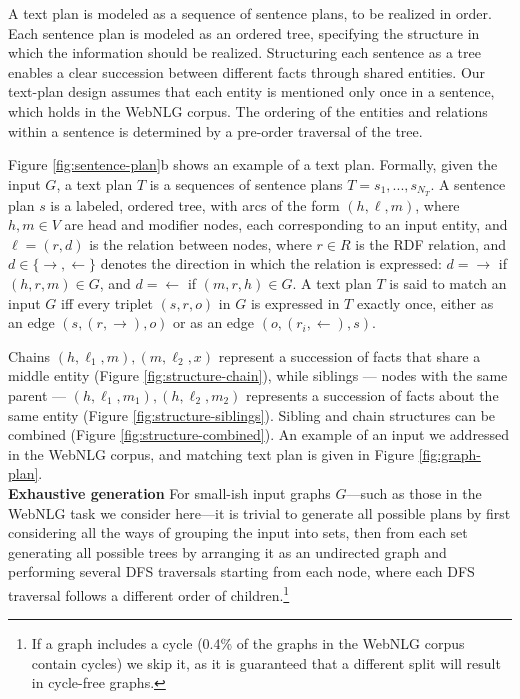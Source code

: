 \documentclass[11pt,a4paper]{article}
\begin{document}
A text plan is modeled as a sequence of sentence plans, to be realized in order. Each sentence plan is modeled as an ordered tree, specifying the structure in which the information should be realized. Structuring each sentence as a tree enables a clear succession between different facts through shared entities. Our text-plan design assumes that each entity is mentioned only once in a sentence, which holds in the WebNLG corpus.
The ordering of the entities and relations within a sentence is determined by a pre-order traversal of the tree.

Figure \ref{fig:sentence-plan}b shows an example of a text plan. 
Formally, given the input $G$, a text plan $T$ is a sequences of sentence plans $T=s_1,...,s_{N_T}$. A sentence plan $s$ is a labeled, ordered tree, with arcs of the form $(h,\ell,m)$, where $h,m \in V$ are head and modifier nodes, each corresponding to an input entity, and $\ell=(r,d)$ is the relation between nodes, where $r \in R$ is the RDF relation, and $d \in \{\rightarrow,\leftarrow\}$ denotes the direction in which the relation is expressed: $d=\rightarrow$ if $(h,r,m) \in G$, and $d=\leftarrow$ if $(m,r,h)\in G$.
A text plan $T$ is said to match an input $G$ iff every triplet $(s,r,o)$ in $G$ is expressed in $T$ exactly once, either as an edge $(s, (r,\rightarrow), o)$ or as an edge $(o, (r_i, \leftarrow), s)$.

Chains $(h,\ell_1,m), (m,\ell_2,x)$ represent a succession of facts that share a middle entity (Figure \ref{fig:structure-chain}), while siblings --- nodes with the same parent --- $(h,\ell_1,m_1),(h,\ell_2,m_2)$ represents a succession of facts about the same entity (Figure \ref{fig:structure-siblings}). Sibling and chain structures can be combined (Figure \ref{fig:structure-combined}).
An example of an input we addressed in the WebNLG corpus, and matching text plan is given in Figure \ref{fig:graph-plan}.\\
\textbf{Exhaustive generation } For small-ish input graphs $G$---such as those in the WebNLG task we consider here---it is trivial to generate all possible plans by first considering all the ways of grouping the input into sets, then from each set generating all possible trees by arranging it as an undirected graph and performing several DFS traversals starting from each node, where each DFS traversal follows a different order of children.\footnote{If a graph includes a cycle (0.4\% of the graphs in the WebNLG corpus contain cycles) we skip it, as it is guaranteed that a different split will result in cycle-free graphs.}
\end{document}
